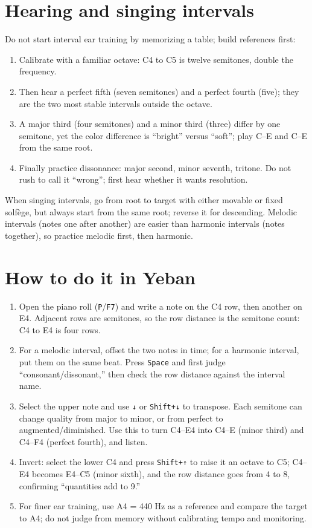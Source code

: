 \section{Hearing and singing intervals}

Do not start interval ear training by memorizing a table; build references first:

\begin{enumerate}
  \item Calibrate with a familiar octave: C4 to C5 is twelve semitones, double the frequency.
  \item Then hear a perfect fifth (seven semitones) and a perfect fourth (five); they are the two most stable intervals outside the octave.
  \item A major third (four semitones) and a minor third (three) differ by one semitone, yet the color difference is ``bright'' versus ``soft''; play C--E and C--E\flatsym{} from the same root.
  \item Finally practice dissonance: major second, minor seventh, tritone. Do not rush to call it ``wrong''; first hear whether it wants resolution.
\end{enumerate}

When singing intervals, go from root to target with either movable or fixed solfège, but always start from the same root; reverse it for descending. Melodic intervals (notes one after another) are easier than harmonic intervals (notes together), so practice melodic first, then harmonic.

\section{How to do it in Yeban}

\begin{enumerate}
  \item Open the piano roll (\texttt{P}/\texttt{F7}) and write a note on the C4 row, then another on E4. Adjacent rows are semitones, so the row distance is the semitone count: C4 to E4 is four rows.
  \item For a melodic interval, offset the two notes in time; for a harmonic interval, put them on the same beat. Press \texttt{Space} and first judge ``consonant/dissonant,'' then check the row distance against the interval name.
  \item Select the upper note and use \texttt{↓} or \texttt{Shift+↓} to transpose. Each semitone can change quality from major to minor, or from perfect to augmented/diminished. Use this to turn C4--E4 into C4--E (minor third) and C4--F4 (perfect fourth), and listen.
  \item Invert: select the lower C4 and press \texttt{Shift+↑} to raise it an octave to C5; C4--E4 becomes E4--C5 (minor sixth), and the row distance goes from 4 to 8, confirming ``quantities add to 9.''
  \item For finer ear training, use A4 = 440 Hz as a reference and compare the target to A4; do not judge from memory without calibrating tempo and monitoring.
\end{enumerate}

